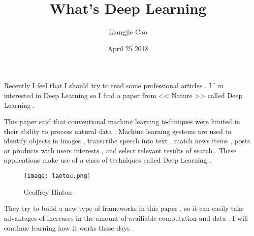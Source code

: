 \documentclass[50pt]{article}
\begin{document}
\title{What's Deep Learning}
\author{Liangjie Cao}
\date{April 25 2018}
\maketitle
\par
Recently I feel that I should try to read some professional articles . I ' m interested in Deep Learning so I find a paper from << Nature >> called Deep Learning . \\
\par
This paper said that conventional machine learning techniques were limited in their ability to process natural data . Machine learning systems are used to identify objects in images , transcribe speech into text , match news items , posts or products with users interests , and select relevant results of search . \cite{name1} These applications make use of a class of techniques called Deep Learning .  \\
 \begin{figure}[ht]
 \centering
 \texttt{[image: laotou.png]}\\
 \caption{Geoffrey Hinton}
\end{figure}
\par
They try to build a new type of frameworks in this paper , so it can easily take advantages of increases in the amount of availiable computation and data . I will continue learning how it works these days . \\
%

\end{document}
